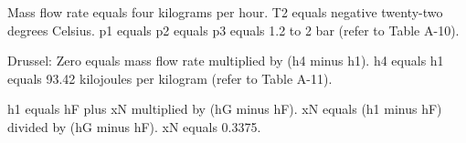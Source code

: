 Mass flow rate equals four kilograms per hour.  
T2 equals negative twenty-two degrees Celsius.  
p1 equals p2 equals p3 equals 1.2 to 2 bar (refer to Table A-10).  

Drussel: Zero equals mass flow rate multiplied by (h4 minus h1).  
h4 equals h1 equals 93.42 kilojoules per kilogram (refer to Table A-11).  

h1 equals hF plus xN multiplied by (hG minus hF).  
xN equals (h1 minus hF) divided by (hG minus hF).  
xN equals 0.3375.